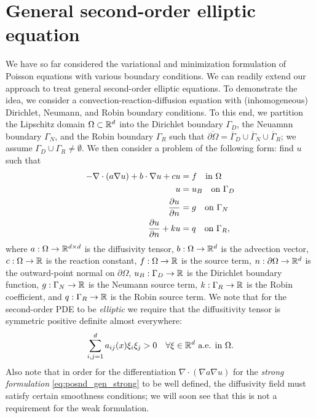 \section{General second-order elliptic equation}
We have so far considered the variational and minimization formulation of Poisson equations with various boundary conditions. We can readily extend our approach to treat general second-order elliptic equations. To demonstrate the idea, we consider a convection-reaction-diffusion equation with (inhomogeneous) Dirichlet, Neumann, and Robin boundary conditions. To this end, we partition the Lipschitz domain $\Omega \subset \mathbb{R}^d$ into the Dirichlet boundary $\Gamma_D$, the Neuamnn boundary $\Gamma_N$, and the Robin boundary $\Gamma_R$ such that $\overline{\partial \Omega} = \overline{\Gamma}_D \cup \overline{\Gamma}_N \cup \overline{\Gamma}_R$; we assume $\Gamma_D \cup \Gamma_R \neq \emptyset$. We then consider a problem of the following form: find $u$ such that
\begin{align}
  - \nabla \cdot (a \nabla u) + b \cdot \nabla u + c u &= f \quad \text{in } \Omega
  \notag \\
  u &= u_B \quad \text{on } \Gamma_D \label{eq:posnd_gen_strong} \\
  \frac{\partial u}{\partial n} &= g \quad \text{on } \Gamma_N \notag \\
  \frac{\partial u}{\partial n}+ k u &= q \quad \text{on } \Gamma_R, \notag
\end{align}
where $a: \Omega \to \mathbb{R}^{d \times d}$ is the diffusivity tensor, $b: \Omega \to \mathbb{R}^d$ is the advection vector, $c: \Omega \to \mathbb{R}$ is the reaction constant, $f: \Omega \to \mathbb{R}$ is the source term,  $n: \partial \Omega \to \mathbb{R}^d$ is the outward-point normal on $\partial \Omega$, $u_B: \Gamma_D \to \mathbb{R}$ is the Dirichlet boundary function, $g: \Gamma_N \to \mathbb{R}$ is the Neumann source term, $k: \Gamma_R \to \mathbb{R}$ is the Robin coefficient, and $q: \Gamma_R \to \mathbb{R}$ is the Robin source term.  We note that for the second-order PDE to be \emph{elliptic} we require that the diffusitivity tensor is symmetric positive definite almost everywhere:
\begin{equation*}
  \sum_{i,j=1}^d a_{ij}(x) \xi_i \xi_j > 0 \quad \forall \xi \in \mathbb{R}^d \text{ a.e. in } \Omega.
\end{equation*}
Also note that in order for the differentiation $\nabla \cdot (\nabla a \nabla u)$ for the \emph{strong formulation} \eqref{eq:posnd_gen_strong} to be well defined, the diffusivity field must satisfy certain smoothness conditions; we will soon see that this is not a requirement for the weak formulation.

